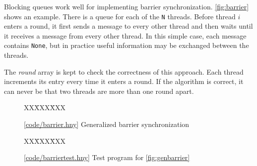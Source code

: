 \documentclass{report}
\newcommand{\harmonysource}[1]{
\begin{tabbing}
XX\=XXX\=XXX\kill
    
\end{tabbing}
}
\newcommand{\harmonylink}[1]{%
[\href{https://harmony.cs.cornell.edu/#1}{\underline{#1}}]%
}
\newenvironment{code}{
\tcolorbox
}{
\endtcolorbox
}
\begin{document}

Blocking queues work well for implementing barrier synchronization.
\autoref{fig:barrier} shows an example.  There is a queue
for each of the \texttt{N} threads.
Before thread $i$ enters a round, it first sends a message to every
other thread and then waits until it receives a message from
every other thread.
In this simple case, each message contains \texttt{None}, but in practice useful
information may be exchanged between the threads.

The \textit{round} array is kept to check the correctness of this
approach.  Each thread increments its entry every time it enters
a round.  If the algorithm is correct, it can never be that two threads
are more than one round apart.

\begin{figure}
\begin{code}
\harmonysource{barrier}
\end{code}
\caption{\harmonylink{code/barrier.hny} Generalized barrier synchronization}
\label{fig:genbarrier}
\end{figure}

\begin{figure}
\begin{code}
\harmonysource{barriertest}
\end{code}
\caption{\harmonylink{code/barriertest.hny} Test program for \autoref{fig:genbarrier}}
\label{fig:barriertest}
\end{figure}
\end{document}
